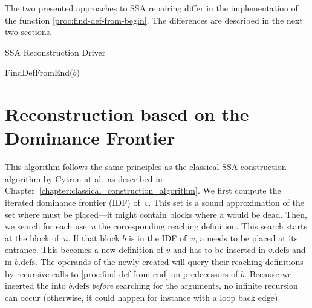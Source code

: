 {The two presented approaches to SSA repairing differ in the implementation of the function \ref{proc:find-def-from-begin}.
The differences are described in the next two sections.

\begin{algorithm}
	\caption{SSA Reconstruction Driver}
	\label{alg:ssaconstr_driver}

\end{algorithm}

\begin{procedure}
  \caption{FindDefFromEnd($b$)}
  \label{proc:find-def-from-end}
\end{procedure}

\section{Reconstruction based on the Dominance Frontier}
This algorithm follows the same principles as the classical SSA construction algorithm by Cytron at al.~as described in Chapter~\ref{chapter:classical_construction_algorithm}.
We first compute the iterated dominance frontier (IDF) of~$v$.
This set is a sound approximation of the set where \phifuns must be placed---it might contain blocks where a \phifun would be dead.
Then, we search for each use~$u$ the corresponding reaching definition.
This search starts at the block of~$u$.
If that block $b$ is in the IDF of~$v$, a \phifun needs to be placed at its entrance.
This \phifun becomes a new definition of $v$ and has to be inserted in $v.\textrm{defs}$ and in $b.\textrm{defs}$.
The operands of the newly created \phifun will query their reaching definitions by recursive calls to \ref{proc:find-def-from-end} on predecessors of $b$.
Because we inserted the \phifun into $b.\textrm{defs}$ \emph{before} searching for the arguments, no infinite recursion can occur (otherwise, it could happen for instance with a loop back edge).

}
